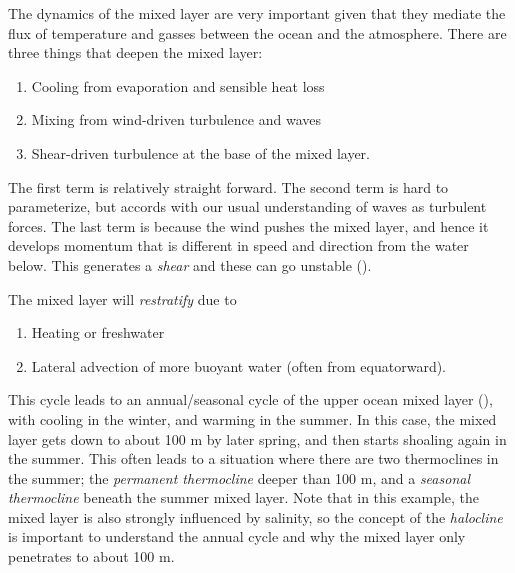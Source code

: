 The dynamics of the mixed layer are very important given that they mediate the flux of temperature and gasses between the ocean and the atmosphere.  There are three things that deepen the mixed layer:
\begin{enumerate}
    \item Cooling from evaporation and sensible heat loss
    \item Mixing from wind-driven turbulence and waves
    \item Shear-driven turbulence at the base of the mixed layer.
\end{enumerate}
The first term is relatively straight forward.  The second term is hard to parameterize, but accords with  our usual understanding of waves as turbulent forces.  The last term is because the wind pushes the mixed layer, and hence it develops momentum that is different in speed and direction from the water below.  This generates a \emph{shear} and these can go unstable ().  

The mixed layer will \emph{restratify} due to 
\begin{enumerate}
    \item Heating or freshwater
    \item Lateral advection of more buoyant water (often from equatorward).  
\end{enumerate}

This cycle leads to an annual/seasonal cycle of the upper ocean mixed layer (), with cooling in the winter, and warming in the summer.  In this case, the mixed layer gets down to about 100 m by later spring, and then starts shoaling again in the summer.  This often leads to a situation where there are two thermoclines in the summer; the \emph{permanent thermocline} deeper than 100 m, and a \emph{seasonal thermocline} beneath the summer mixed layer.  Note that in this example, the mixed layer is also strongly influenced by salinity, so the concept of the \emph{halocline} is important to understand the annual cycle and why the mixed layer only penetrates to about 100 m.  


